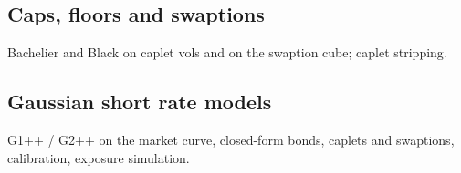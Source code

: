 \pending

\subsection{Caps, floors and swaptions}\label{sec:mp-vol}
Bachelier and Black on caplet vols and on the swaption cube; caplet stripping.

\pending

\subsection{Gaussian short rate models}\label{sec:mp-gsr}
G1++ / G2++ on the market curve, closed-form bonds, caplets and swaptions, calibration, exposure simulation.

\pending
